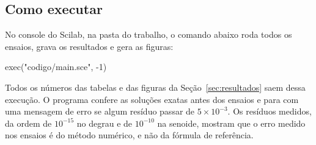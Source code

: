\subsection{Como executar}

No console do Scilab, na pasta do trabalho, o comando abaixo roda todos os ensaios, grava os resultados e gera as figuras:
\begin{codigo}
exec("codigo/main.sce", -1)
\end{codigo}
Todos os números das tabelas e das figuras da Seção~\ref{sec:resultados} saem dessa execução. O programa confere as soluções exatas antes dos ensaios e para com uma mensagem de erro se algum resíduo passar de \(5\times10^{-3}\). Os resíduos medidos, da ordem de \(10^{-15}\) no degrau e de \(10^{-10}\) na senoide, mostram que o erro medido nos ensaios é do método numérico, e não da fórmula de referência.
